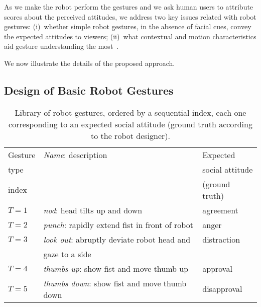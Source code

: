 As we make the robot perform the gestures and we ask human users to attribute scores about the perceived attitudes, we address two key issues related with robot gestures: (i)~whether simple robot gestures, in the absence of facial cues, convey the expected attitudes to viewers; (ii)~what contextual and motion characteristics aid gesture understanding the most~\cite{li:2011:ijsr}.

We now illustrate the details of the proposed approach.

\subsection{Design of Basic Robot Gestures}

\begin{table}
\centering
\caption[Library of robot gestures.]{Library of robot gestures, ordered by a sequential index, each one corresponding to an expected social attitude (ground truth according to the robot designer).}
\begin{tabular}{*{3}{l}} %
\toprule
Gesture& \emph{Name}: description                            & Expected \\
type   &                                                     & social attitude \\
index  &                                                     & (ground truth) \\
\midrule
$T=1$  & \emph{nod}: head tilts up and down                  & agreement \\
$T=2$  & \emph{punch}: rapidly extend fist in front of robot & anger \\
$T=3$  & \emph{look out}: abruptly deviate robot head and    & distraction \\
       & gaze to a side                                      & \\
$T=4$  & \emph{thumbs up}: show fist and move thumb up       & approval \\
$T=5$  & \emph{thumbs down}: show fist and move thumb down   & disapproval \\
\bottomrule
\end{tabular}
\label{tab:robot_gestures}
\end{table}

